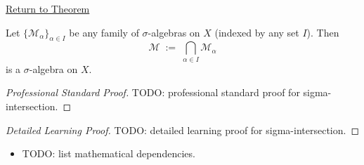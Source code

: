 \newpage
{}
\label{prf:sigma-intersection}

\begin{remark*}[Return]
\hyperref[thm:sigma-intersection]{Return to Theorem}
\end{remark*}

\begin{theorem*}
Let $\{\mathcal{M}_\alpha\}_{\alpha \in I}$ be any family of $\sigma$-algebras
on $X$ (indexed by any set $I$). Then
\[
\mathcal{M} \;:=\; \bigcap_{\alpha \in I} \mathcal{M}_\alpha
\]
is a $\sigma$-algebra on $X$.
\end{theorem*}

\begin{proof}[Professional Standard Proof]
\LRAProofBodyStart
TODO: professional standard proof for sigma-intersection.
\end{proof}

\begin{proof}[Detailed Learning Proof]
\LRAProofBodyStart
TODO: detailed learning proof for sigma-intersection.
\end{proof}

\begin{remark*}
\end{remark*}

\begin{dependencies}
\begin{itemize}
  \item TODO: list mathematical dependencies.
\end{itemize}
\end{dependencies}

\clearpage
